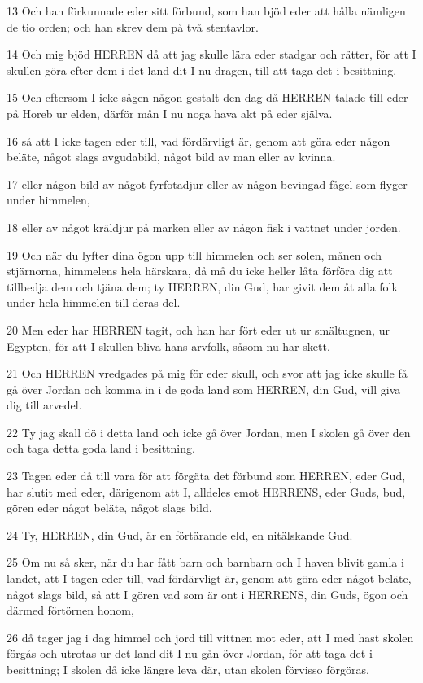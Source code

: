 \par 13 Och han förkunnade eder sitt förbund, som han bjöd eder att hålla nämligen de tio orden; och han skrev dem på två stentavlor.
\par 14 Och mig bjöd HERREN då att jag skulle lära eder stadgar och rätter, för att I skullen göra efter dem i det land dit I nu dragen, till att taga det i besittning.
\par 15 Och eftersom I icke sågen någon gestalt den dag då HERREN talade till eder på Horeb ur elden, därför mån I nu noga hava akt på eder själva.
\par 16 så att I icke tagen eder till, vad fördärvligt är, genom att göra eder någon beläte, något slags avgudabild, något bild av man eller av kvinna.
\par 17 eller någon bild av något fyrfotadjur eller av någon bevingad fågel som flyger under himmelen,
\par 18 eller av något kräldjur på marken eller av någon fisk i vattnet under jorden.
\par 19 Och när du lyfter dina ögon upp till himmelen och ser solen, månen och stjärnorna, himmelens hela härskara, då må du icke heller låta förföra dig att tillbedja dem och tjäna dem; ty HERREN, din Gud, har givit dem åt alla folk under hela himmelen till deras del.
\par 20 Men eder har HERREN tagit, och han har fört eder ut ur smältugnen, ur Egypten, för att I skullen bliva hans arvfolk, såsom nu har skett.
\par 21 Och HERREN vredgades på mig för eder skull, och svor att jag icke skulle få gå över Jordan och komma in i de goda land som HERREN, din Gud, vill giva dig till arvedel.
\par 22 Ty jag skall dö i detta land och icke gå över Jordan, men I skolen gå över den och taga detta goda land i besittning.
\par 23 Tagen eder då till vara för att förgäta det förbund som HERREN, eder Gud, har slutit med eder, därigenom att I, alldeles emot HERRENS, eder Guds, bud, gören eder något beläte, något slags bild.
\par 24 Ty, HERREN, din Gud, är en förtärande eld, en nitälskande Gud.
\par 25 Om nu så sker, när du har fått barn och barnbarn och I haven blivit gamla i landet, att I tagen eder till, vad fördärvligt är, genom att göra eder något beläte, något slags bild, så att I gören vad som är ont i HERRENS, din Guds, ögon och därmed förtörnen honom,
\par 26 då tager jag i dag himmel och jord till vittnen mot eder, att I med hast skolen förgås och utrotas ur det land dit I nu gån över Jordan, för att taga det i besittning; I skolen då icke längre leva där, utan skolen förvisso förgöras.

